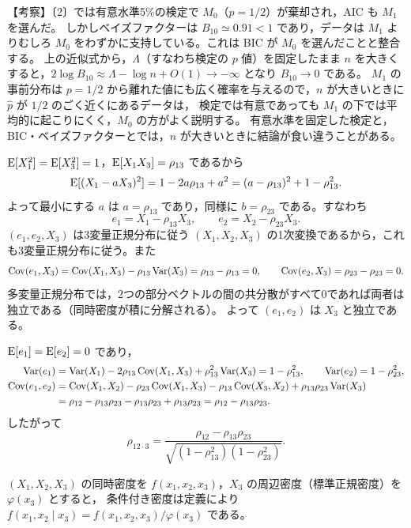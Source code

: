 \documentclass[a4paper,11pt]{ltjsarticle}
\begin{document}
【考察】〔2〕では有意水準5\%の検定で $M_0$（$p=1/2$）が棄却され，AIC も $M_1$ を選んだ。
しかしベイズファクターは $B_{10}\simeq0.91<1$ であり，データは $M_1$ よりむしろ $M_0$ をわずかに支持している。これは BIC が $M_0$ を選んだことと整合する。
上の近似式から，$\Lambda$（すなわち検定の $p$ 値）を固定したまま $n$ を大きくすると，$2\log B_{10}\approx\Lambda-\log n+O(1)\to-\infty$ となり $B_{10}\to0$ である。
$M_1$ の事前分布は $p=1/2$ から離れた値にも広く確率を与えるので，$n$ が大きいときに $\hat p$ が $1/2$ のごく近くにあるデータは，
検定では有意であっても $M_1$ の下では平均的に起こりにくく，$M_0$ の方がよく説明する。
有意水準を固定した検定と，BIC・ベイズファクターとでは，$n$ が大きいときに結論が食い違うことがある。
\newpage

$\operatorname{E}[X_1^2]=\operatorname{E}[X_3^2]=1$，$\operatorname{E}[X_1X_3]=\rho_{13}$ であるから
\[
\operatorname{E}[(X_1-aX_3)^2]=1-2a\rho_{13}+a^2=(a-\rho_{13})^2+1-\rho_{13}^2 .
\]
よって最小にする $a$ は $\boxed{a=\rho_{13}}$ であり，同様に $b=\rho_{23}$ である。すなわち
\[
e_1=X_1-\rho_{13}X_3,\qquad e_2=X_2-\rho_{23}X_3 .
\]
$(e_1,e_2,X_3)$ は3変量正規分布に従う $(X_1,X_2,X_3)$ の1次変換であるから，これも3変量正規分布に従う。また
\[
\operatorname{Cov}(e_1,X_3)=\operatorname{Cov}(X_1,X_3)-\rho_{13}\operatorname{Var}(X_3)=\rho_{13}-\rho_{13}=0,\qquad \operatorname{Cov}(e_2,X_3)=\rho_{23}-\rho_{23}=0 .
\]
多変量正規分布では，2つの部分ベクトルの間の共分散がすべて0であれば両者は独立である（同時密度が積に分解される）。
よって $(e_1,e_2)$ は $X_3$ と独立である。

$\operatorname{E}[e_1]=\operatorname{E}[e_2]=0$ であり，
\begin{align*}
\operatorname{Var}(e_1)&=\operatorname{Var}(X_1)-2\rho_{13}\operatorname{Cov}(X_1,X_3)+\rho_{13}^2\operatorname{Var}(X_3)=1-\rho_{13}^2,\qquad \operatorname{Var}(e_2)=1-\rho_{23}^2,\\
\operatorname{Cov}(e_1,e_2)&=\operatorname{Cov}(X_1,X_2)-\rho_{23}\operatorname{Cov}(X_1,X_3)-\rho_{13}\operatorname{Cov}(X_3,X_2)+\rho_{13}\rho_{23}\operatorname{Var}(X_3)\\
&=\rho_{12}-\rho_{13}\rho_{23}-\rho_{13}\rho_{23}+\rho_{13}\rho_{23}=\rho_{12}-\rho_{13}\rho_{23}.
\end{align*}
したがって
\[
\rho_{12\cdot3}=\boxed{\frac{\rho_{12}-\rho_{13}\rho_{23}}{\sqrt{(1-\rho_{13}^2)(1-\rho_{23}^2)}}}.
\]

$(X_1,X_2,X_3)$ の同時密度を $f(x_1,x_2,x_3)$，$X_3$ の周辺密度（標準正規密度）を $\varphi(x_3)$ とすると，
条件付き密度は定義により $f(x_1,x_2\mid x_3)=f(x_1,x_2,x_3)/\varphi(x_3)$ である。
\end{document}
